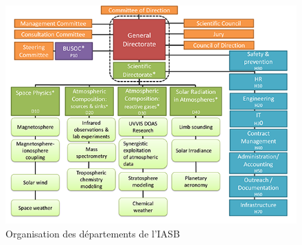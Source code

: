 \documentclass[11pt]{article}
\begin{document}
\begin{figure}[t]
    \begin{center}
        \includegraphics[scale=0.5]{organization.png}
        \caption{Organisation des départements de l'IASB}
    \end{center}
\end{figure}

\newpage
\end{document}
